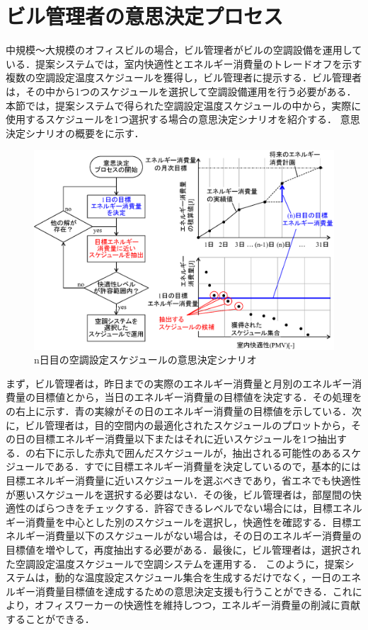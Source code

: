 \section{ビル管理者の意思決定プロセス}\label{sec::decision_making}
中規模～大規模のオフィスビルの場合，ビル管理者がビルの空調設備を運用している．提案システムでは，室内快適性とエネルギー消費量のトレードオフを示す複数の空調設定温度スケジュールを獲得し，ビル管理者に提示する．ビル管理者は，その中から1つのスケジュールを選択して空調設備運用を行う必要がある．本節では，提案システムで得られた空調設定温度スケジュールの中から，実際に使用するスケジュールを1つ選択する場合の意思決定シナリオを紹介する．
意思決定シナリオの概要をに示す．

\begin{figure}[htbp]
  \begin{center}
    \includegraphics[width=0.8\linewidth]{fig/math_decision_making.eps}
  \end{center}
  \caption{n日目の空調設定スケジュールの意思決定シナリオ}
  \label{fig::math_decision_making}
\end{figure}

まず，ビル管理者は，昨日までの実際のエネルギー消費量と月別のエネルギー消費量の目標値とから，当日のエネルギー消費量の目標値を決定する．その処理をの右上に示す．青の実線がその日のエネルギー消費量の目標値を示している．次に，ビル管理者は，目的空間内の最適化されたスケジュールのプロットから，その日の目標エネルギー消費量以下またはそれに近いスケジュールを1つ抽出する．の右下に示した赤丸で囲んだスケジュールが，抽出される可能性のあるスケジュールである．すでに目標エネルギー消費量を決定しているので，基本的には目標エネルギー消費量に近いスケジュールを選ぶべきであり，省エネでも快適性が悪いスケジュールを選択する必要はない．その後，ビル管理者は，部屋間の快適性のばらつきをチェックする．許容できるレベルでない場合には，目標エネルギー消費量を中心とした別のスケジュールを選択し，快適性を確認する．目標エネルギー消費量以下のスケジュールがない場合は，その日のエネルギー消費量の目標値を増やして，再度抽出する必要がある．最後に，ビル管理者は，選択された空調設定温度スケジュールで空調システムを運用する．
このように，提案システムは，動的な温度設定スケジュール集合を生成するだけでなく，一日のエネルギー消費量目標値を達成するための意思決定支援も行うことができる．これにより，オフィスワーカーの快適性を維持しつつ，エネルギー消費量の削減に貢献することができる．

